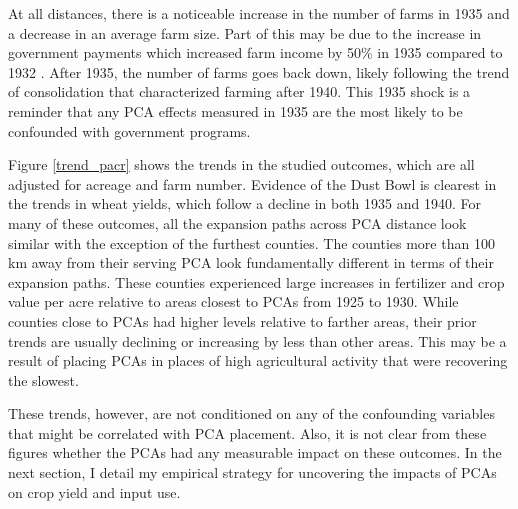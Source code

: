 \documentclass[12pt]{article}
\begin{document}
At all distances, there is a noticeable increase in the number of farms in 1935 and a decrease in an average farm size.
Part of this may be due to the increase in government payments which increased farm income by 50\% in 1935 compared to 1932 \citep{rasmussen1976short}.
After 1935, the number of farms goes back down, likely following the trend of consolidation that characterized farming after 1940. 
This 1935 shock is a reminder that any PCA effects measured in 1935 are the most likely to be confounded with government programs.

Figure \ref{trend_pacr} shows the trends in the studied outcomes, which are all adjusted for acreage and farm number.
Evidence of the Dust Bowl is clearest in the trends in wheat yields, which follow a decline in both 1935 and 1940.
For many of these outcomes, all the expansion paths across PCA distance look similar with the exception of the furthest counties.
The counties more than 100 km away from their serving PCA look fundamentally different in terms of their expansion paths.
These counties experienced large increases in fertilizer and crop value per acre relative to areas closest to PCAs from 1925 to 1930.
While counties close to PCAs had higher levels relative to farther areas, their prior trends are usually declining or increasing by less than other areas.
This may be a result of placing PCAs in places of high agricultural activity that were recovering the slowest.

These trends, however, are not conditioned on any of the confounding variables that might be correlated with PCA placement.
Also, it is not clear from these figures whether the PCAs had any measurable impact on these outcomes.
In the next section, I detail my empirical strategy for uncovering the impacts of PCAs on crop yield and input use.
\end{document}
